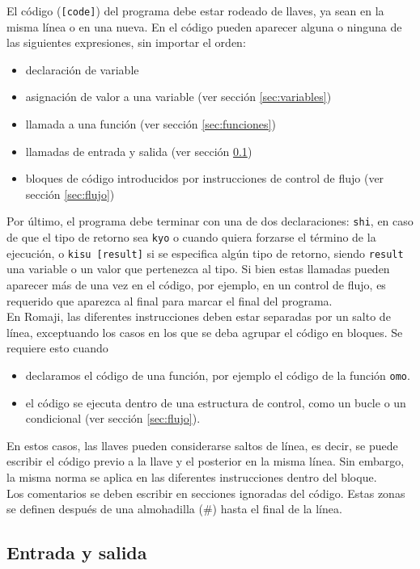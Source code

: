 \documentclass[spanish]{article}
\begin{document}
El código (\texttt{[code]}) del programa debe estar rodeado de llaves, ya sean en la misma línea o en una nueva. En el código pueden aparecer alguna o ninguna de las siguientes expresiones, sin importar el orden:
\begin{itemize}
  \item{declaración de variable}
  \item{asignación de valor a una variable (ver sección \ref{sec:variables})}
  \item{llamada a una función (ver sección \ref{sec:funciones})}
  \item{llamadas de entrada y salida (ver sección \ref{sec:entrada-salida})}
  \item{bloques de código introducidos por instrucciones de control de flujo (ver sección \ref{sec:flujo})}
\end{itemize}
Por último, el programa debe terminar con una de dos declaraciones: \texttt{shi}, en caso de que el tipo de retorno sea \texttt{kyo} o cuando quiera forzarse el término de la ejecución, o \texttt{kisu [result]} si se especifica algún tipo de retorno, siendo \texttt{result} una variable o un valor que pertenezca al tipo. Si bien estas llamadas pueden aparecer más de una vez en el código, por ejemplo, en un control de flujo, es requerido que aparezca al final para marcar el final del programa.\\

En Romaji, las diferentes instrucciones deben estar separadas por un salto de línea, exceptuando los casos en los que se deba agrupar el código en bloques. Se requiere esto cuando
\begin{itemize}
  \item{declaramos el código de una función, por ejemplo el código de la función \texttt{omo}.}
  \item{el código se ejecuta dentro de una estructura de control, como un bucle o un condicional (ver sección \ref{sec:flujo}).}
\end{itemize}
En estos casos, las llaves pueden considerarse saltos de línea, es decir, se puede escribir el código previo a la llave y el posterior en la misma línea. Sin embargo, la misma norma se aplica en las diferentes instrucciones dentro del bloque.\\

Los comentarios se deben escribir en secciones ignoradas del código. Estas zonas se definen después de una almohadilla (\#) hasta el final de la línea.

\subsection{Entrada y salida}
\label{sec:entrada-salida}
\end{document}
